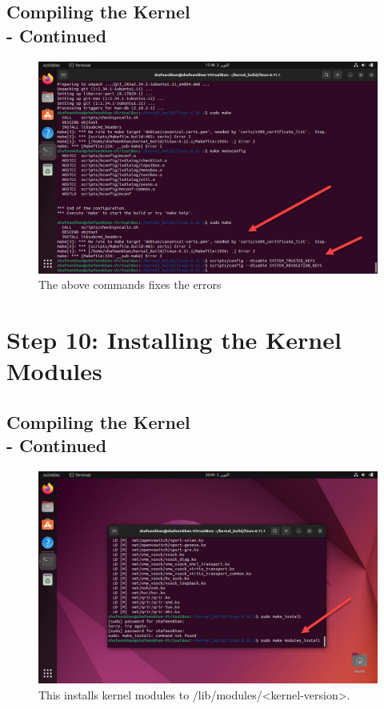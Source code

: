 \documentclass{article}
\begin{document}
\subsection{Compiling the Kernel \\-  Continued}
\begin{figure}[H]
    \centering
    \includegraphics[width=0.8\linewidth]{19.jpg}
    \caption{The above commands fixes the errors }
\end{figure}

\section{Step 10: Installing the Kernel Modules}
\subsection{Compiling the Kernel \\-  Continued}
\begin{figure}[H]
    \centering
    \includegraphics[width=0.8\linewidth]{14.jpg}
    \caption{This installs kernel modules to /lib/modules/<kernel-version>. }
\end{figure}
\end{document}
